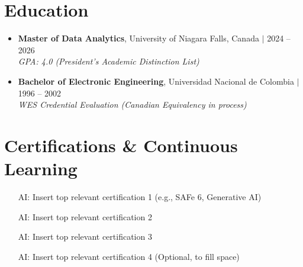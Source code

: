 \documentclass[letterpaper,10pt]{article}
\begin{document}
\section*{Education}
\begin{itemize}
\item \textbf{Master of Data Analytics}, University of Niagara Falls, Canada $|$ 2024 -- 2026 \\
\textit{GPA: 4.0 (President's Academic Distinction List)}
\item \textbf{Bachelor of Electronic Engineering}, Universidad Nacional de Colombia $|$ 1996 -- 2002 \\
\textit{WES Credential Evaluation (Canadian Equivalency in process)}
\end{itemize}

\section*{Certifications \& Continuous Learning}
\begin{itemize}
\item [AI: Insert top relevant certification 1 (e.g., SAFe 6, Generative AI)]
\item [AI: Insert top relevant certification 2]
\item [AI: Insert top relevant certification 3]
\item [AI: Insert top relevant certification 4 (Optional, to fill space)]
\end{itemize}
\end{document}
